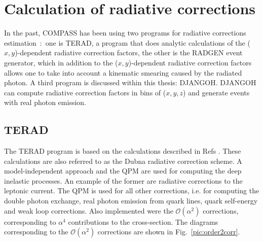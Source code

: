 
\chapter{Calculation of radiative corrections} %

\label{ch:Calculation} %


In the past, COMPASS has been using two programs for radiative corrections estimation~:~one is TERAD, a program that does analytic calculations of the ($x,y$)-dependent radiative correction factors, the other is the RADGEN event generator, which in addition to the ($x,y$)-dependent radiative correction factors allows one to take into account a kinematic smearing caused by the radiated photon. A third program is discussed within this thesis: DJANGOH. DJANGOH can compute radiative correction factors in bins of ($x,y,z$) and generate events with real photon emission.

\section{TERAD}

The TERAD program is based on the calculations described in Refs \cite{TERAD1,TERAD2,TERAD3}. These calculations are also referred to as the Dubna radiative correction scheme. A model-independent approach and the QPM are used for computing the deep inelastic processes. An example of the former are radiative corrections to the leptonic current. The QPM is used for all other corrections, i.e. for computing the double photon exchange, real photon emission from quark lines, quark self-energy and weak loop corrections. Also implemented were the $\mathscr{O}(\alpha^2)$ corrections, corresponding to $\alpha^4$ contributions to the cross-section. The diagrams corresponding to the $\mathscr{O}(\alpha^2)$ corrections are shown in Fig.~\ref{pic:order2corr}.

